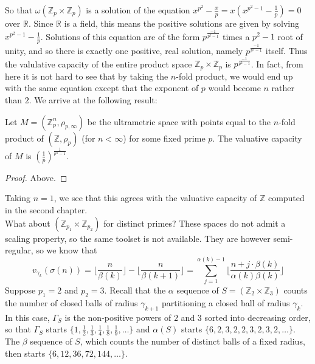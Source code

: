 So that $\omega(\mathbb{Z}_p \times \mathbb{Z}_p)$ is a solution of the equation $x^{p^2} - \frac{x}{p} = x(x^{p^2-1} - \frac{1}{p})=0$ over $\mathbb{R}$. Since $\mathbb{R}$ is a field, this means the positive solutions are given by solving $x^{p^2-1}-\frac{1}{p}$. Solutions of this equation are of the form $p^{\frac{-1}{p^2-1}}$ times a $p^2-1$ root of unity, and so there is exactly one positive, real solution, namely $p^{\frac{-1}{p^2-1}}$ itself. Thus the valulative capacity of the entire product space $\mathbb{Z}_p \times \mathbb{Z}_p$ is $p^{\frac{-1}{p^2-1}}$. In fact, from here it is not hard to see that by taking the $n$-fold product, we would end up with the same equation except that the exponent of $p$ would become $n$ rather than $2$. We arrive at the following result:\\

\begin{proposition}
Let $M=(\mathbb{Z}_p^n, \rho_{p, \infty})$ be the ultrametric space with points equal to the $n$-fold product of $(\mathbb{Z}, \rho_p)$ (for $n < \infty$) for some fixed prime $p$. The valuative capacity of $M$ is  $(\frac{1}{p})^{\frac{1}{p^n-1}}$.
\end{proposition}

\begin{proof}
Above.
\end{proof}

Taking $n=1$, we see that this agrees with the valuative capacity of $\mathbb{Z}$ computed in the second chapter. \\

What about $(\mathbb{Z}_{p_1} \times \mathbb{Z}_{p_2})$ for distinct primes? These spaces do not admit a scaling property, so the same toolset is not available. They are however semi-regular, so we know that\\  \[v_{\gamma_k}(\sigma(n)) =  \lfloor\frac{n}{\beta(k)}\rfloor - \lfloor\frac{n}{\beta(k+1)}\rfloor = \sum_{j=1}^{\alpha(k)-1} \lfloor \frac{n + j\cdot \beta(k)}{\alpha(k)\beta(k)} \rfloor \]
Suppose $p_1 =2$ and $p_2 =3$. Recall that the $\alpha$ sequence of $S=(\mathbb{Z}_{2} \times \mathbb{Z}_{3})$ counts the number of closed balls of radius $\gamma_{k+1}$ partitioning a closed ball of radius $\gamma_k$. In this case, $\Gamma_S$ is the non-positive powers of $2$ and $3$ sorted into decreasing order, so that $\Gamma_S$ starts $\{1, \frac{1}{2},\frac{1}{3},\frac{1}{4},\frac{1}{8},\frac{1}{9},\ldots \}$ and $\alpha(S)$ starts $\{6,2,3,2,2,3,2,3,2,\ldots\}$. The $\beta$ sequence of $S$, which counts the number of distinct balls of a fixed radius, then starts $\{6,12,36,72,144,\ldots\}$.\\


